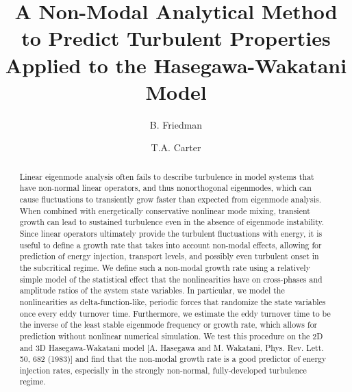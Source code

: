 \documentclass[twocolumn,showkeys,superscriptaddress]{revtex4}
\begin{document}
\title{A Non-Modal Analytical Method to Predict Turbulent Properties Applied to the Hasegawa-Wakatani Model}

\author{B. Friedman}



\author{T.A. Carter}




\begin{abstract}
Linear eigenmode analysis often fails to describe turbulence in model
systems that have non-normal linear operators, and thus
nonorthogonal eigenmodes, which can cause fluctuations to transiently grow faster than expected from eigenmode analysis. When combined with energetically conservative nonlinear mode mixing, 
transient growth can lead to sustained turbulence even in the absence of eigenmode instability. 
Since linear operators ultimately provide the turbulent fluctuations with energy, it is useful to define a growth rate that takes into account non-modal effects, allowing for
prediction of energy injection, transport levels, and possibly even turbulent onset in the subcritical regime. 
We define such a non-modal growth rate using a relatively simple model
of the statistical effect that the nonlinearities have on cross-phases and amplitude ratios of the system state variables. 
In particular, we model the nonlinearities as delta-function-like, periodic forces that randomize the state variables once every eddy turnover time. Furthermore, we estimate the eddy turnover
time to be the inverse of the least stable eigenmode frequency or growth rate, which allows for prediction without nonlinear numerical simulation. 
We test this procedure on the 2D and 3D Hasegawa-Wakatani model [A. Hasegawa and M. Wakatani, Phys. Rev. Lett. 50, 682 (1983)] and find that
the non-modal growth rate is a good predictor of energy injection rates, especially in the strongly non-normal, fully-developed turbulence regime.
\end{abstract}

\maketitle
\end{document}
